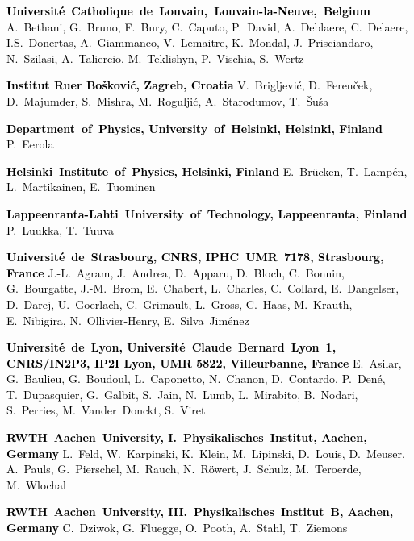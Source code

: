 \textcolor{black}{\textbf{Universit\'{e}~Catholique~de~Louvain,~Louvain-la-Neuve,~Belgium}\newline
A.~Bethani, G.~Bruno, F.~Bury, C.~Caputo, P.~David, A.~Deblaere, C.~Delaere, I.S.~Donertas, A.~Giammanco, V.~Lemaitre, K.~Mondal,  J.~Prisciandaro, N.~Szilasi, A.~Taliercio, M.~Teklishyn, P.~Vischia, S.~Wertz}

\textcolor{black}{\textbf{Institut Ru{\dj}er Bo\v{s}kovi\'{c}, Zagreb, Croatia}\newline
V.~Brigljevi\'{c}, D.~Feren\v{c}ek, D.~Majumder, S.~Mishra, M.~Rogulji\'{c}, A.~Starodumov, T.~\v{S}u\v{s}a}

\textcolor{black}{\textbf{Department~of~Physics, University~of~Helsinki, Helsinki, Finland}\newline
P.~Eerola}

\textcolor{black}{
\textbf{Helsinki~Institute~of~Physics, Helsinki, Finland}\newline
E.~Br\"{u}cken, T.~Lamp\'{e}n, L.~Martikainen, E.~Tuominen}

\textcolor{black}{\textbf{Lappeenranta-Lahti~University~of~Technology, Lappeenranta, Finland}\newline
P.~Luukka, T.~Tuuva}

\textcolor{black}{\textbf{Universit\'{e}~de~Strasbourg, CNRS, IPHC~UMR~7178, Strasbourg, France}\newline
J.-L.~Agram, J.~Andrea, D.~Apparu, D.~Bloch, C.~Bonnin, G.~Bourgatte, J.-M.~Brom, E.~Chabert, L.~Charles, C.~Collard, E.~Dangelser, D.~Darej, U.~Goerlach, C.~Grimault, L.~Gross, C.~Haas, M.~Krauth, E.~Nibigira, N.~Ollivier-Henry, E.~Silva~Jim\'{e}nez}

\textcolor{black}{\textbf{Universit\'{e}~de~Lyon, Universit\'{e}~Claude~Bernard~Lyon~1, CNRS/IN2P3, IP2I Lyon, UMR 5822, Villeurbanne, France}\newline
E.~Asilar, G.~Baulieu, G.~Boudoul, L.~Caponetto, N.~Chanon, D.~Contardo, P.~Den\'{e}, T.~Dupasquier, G.~Galbit, S.~Jain, N.~Lumb, L.~Mirabito, B.~Nodari, S.~Perries, M.~Vander~Donckt, S.~Viret}

\textcolor{black}{\textbf{RWTH~Aachen~University, I.~Physikalisches~Institut, Aachen, Germany}\newline
L.~Feld, W.~Karpinski, K.~Klein, M.~Lipinski, D.~Louis,  D.~Meuser, A.~Pauls, G.~Pierschel, M.~Rauch, N.~R\"{o}wert, J.~Schulz, M.~Teroerde, M.~Wlochal}

\textcolor{black}{\textbf{RWTH~Aachen~University, III.~Physikalisches~Institut~B, Aachen, Germany}\newline
C.~Dziwok, G.~Fluegge, O.~Pooth, A.~Stahl, T.~Ziemons}


